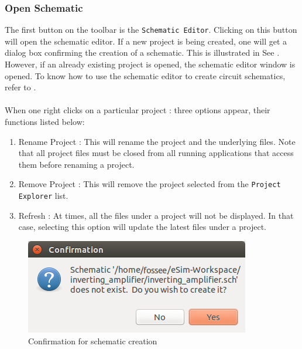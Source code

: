 \subsubsection {Open Schematic}
The first button on the toolbar is the \texttt{Schematic
Editor}. Clicking on this button 
will open the schematic editor. 
If  a new project  is  being  created, one will get a 
dialog box confirming the creation of a schematic. This 
is illustrated in See . 
However, if an already existing project is opened, the 
schematic editor window is opened. To know how to use 
the schematic editor to create circuit schematics, refer 
to . \\ \\
When one right clicks on a particular project : three options appear, their functions listed below: \\
\begin{enumerate}
    \item Rename Project : This will rename the project and the underlying files. Note that all project files must be closed from all running applications that access them before renaming a project.
    \item Remove Project : This will remove the project selected from the \texttt{Project Explorer} list.
    \item Refresh : At times, all the files under a project will not be displayed. In that case, selecting this option will update the latest files under a project. 
\end{enumerate}
\begin{figure}[h]
\centering
\includegraphics[width=\lgfig]{manual_images/schematic-confirmation.png}
\caption{Confirmation for schematic creation}
\label{schematic-confirmation}
\end{figure}

